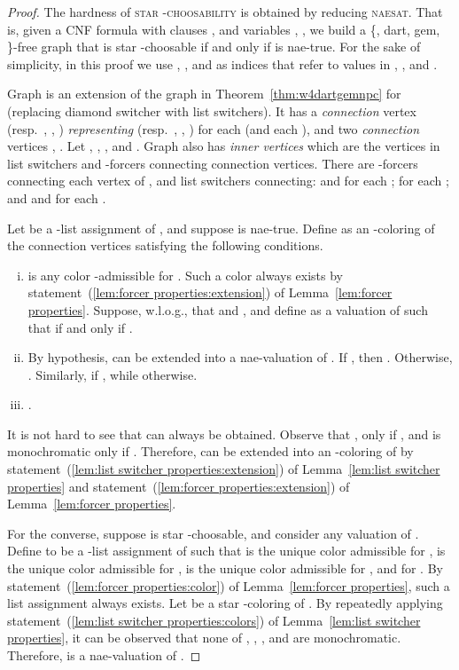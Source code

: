 \documentclass[a4paper, 11pt, oneside]{article}
\newcommand{\stchose}[1]{\textsc{star -choosability}}
\newcommand{\naesatt}{\textsc{naesat}\xspace}
\let\Definition=\emph
\begin{document}
\begin{proof}
 The hardness of \stchose{2} is obtained by reducing \naesatt.  That is, given a CNF formula  with  clauses , and  variables , , we build a \{, dart, gem, \}-free graph  that is star -choosable if and only if  is nae-true.  For the sake of simplicity, in this proof we use , , and  as indices that refer to values in , , and .
  
 Graph  is an extension of the graph in Theorem~\ref{thm:w4dartgemnpc} for  (replacing diamond switcher with list switchers).  It has a \Definition{connection} vertex  (resp.\ , , ) \Definition{representing}  (resp.\ , , ) for each  (and each ), and two \Definition{connection} vertices , .  Let , , , and .  Graph  also has \Definition{inner vertices} which are the vertices in list switchers and -forcers connecting connection vertices.  There are -forcers connecting each vertex of , and list switchers connecting:  and  for each ;  for each ; and  and  for each .  
  
 Let  be a -list assignment of , and suppose  is nae-true.  Define  as an -coloring of the connection vertices satisfying the following conditions.
 \begin{enumerate}[(i)]
  \item  is any color -admissible for .  Such a color always exists by statement~(\ref{lem:forcer properties:extension}) of Lemma~\ref{lem:forcer properties}.  Suppose, w.l.o.g., that  and , and define  as a valuation of  such that  if and only if .  

  \item By hypothesis,  can be extended into a nae-valuation of .  If , then .  Otherwise, .  Similarly,  if , while  otherwise.
    
  \item .  
 \end{enumerate}
 It is not hard to see that  can always be obtained.  Observe that ,  only if , and  is monochromatic only if .  Therefore,  can be extended into an -coloring of  by statement~(\ref{lem:list switcher properties:extension}) of Lemma~\ref{lem:list switcher properties} and statement~(\ref{lem:forcer properties:extension}) of Lemma~\ref{lem:forcer properties}.
 
 For the converse, suppose  is star -choosable, and consider any valuation  of .  Define  to be a -list assignment of  such that  is the unique color admissible for ,  is the unique color admissible for ,  is the unique color admissible for , and  for .  By statement~(\ref{lem:forcer properties:color}) of Lemma~\ref{lem:forcer properties}, such a list assignment always exists.  Let  be a star -coloring of .  By repeatedly applying statement~(\ref{lem:list switcher properties:colors}) of Lemma~\ref{lem:list switcher properties}, it can be observed that none of , , , and  are monochromatic.  Therefore,  is a nae-valuation of .
\end{proof}
\end{document}
